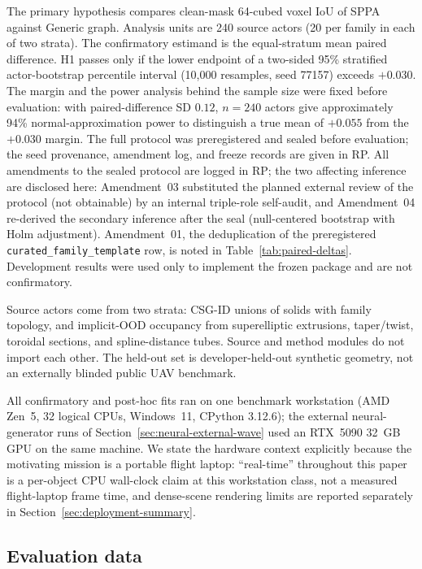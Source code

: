 \documentclass[11pt,a4paper]{article}
\begin{document}
The primary hypothesis compares clean-mask 64-cubed voxel IoU of SPPA
against Generic graph. Analysis units are 240 source actors (20 per family in
each of two strata). The confirmatory estimand is the equal-stratum mean paired
difference. H1 passes only if the lower endpoint of a two-sided 95\% stratified
actor-bootstrap percentile interval (10{,}000 resamples, seed 77157) exceeds
\(+0.030\). The margin and the power analysis behind the sample size were fixed
before evaluation: with paired-difference SD \(0.12\), \(n{=}240\) actors give
approximately 94\% normal-approximation power to distinguish a true mean of
\(+0.055\) from the \(+0.030\) margin. The full protocol was preregistered
and sealed before evaluation; the seed provenance, amendment log, and freeze
records are given in RP. All amendments to the sealed
protocol are logged in RP; the two affecting inference are disclosed here:
Amendment~03 substituted the planned external review
of the protocol (not obtainable) by an internal triple-role self-audit, and
Amendment~04 re-derived the secondary inference after the seal (null-centered
bootstrap with Holm adjustment). Amendment~01, the deduplication of the
preregistered \texttt{curated\_family\_template} row, is noted in
Table~\ref{tab:paired-deltas}. Development results
were used only to implement the frozen package and are not confirmatory.

Source actors come from two strata: CSG-ID unions of solids with family
topology, and implicit-OOD occupancy from superelliptic extrusions,
taper/twist, toroidal sections, and spline-distance tubes. Source and method
modules do not import each other. The held-out set is developer-held-out
synthetic geometry, not an externally blinded public UAV benchmark.

All confirmatory and post-hoc fits ran on one benchmark workstation (AMD
Zen~5, 32 logical CPUs, Windows~11, CPython 3.12.6); the external
neural-generator runs of Section~\ref{sec:neural-external-wave} used an
RTX~5090 32~GB GPU on the same machine. We state the hardware context
explicitly because the motivating mission is a portable flight laptop:
``real-time'' throughout this paper is a per-object CPU wall-clock claim at
this workstation class, not a measured flight-laptop frame time, and
dense-scene rendering limits are reported separately in
Section~\ref{sec:deployment-summary}.

\subsection{Evaluation data}
\label{sec:evaluation-data}
\end{document}
